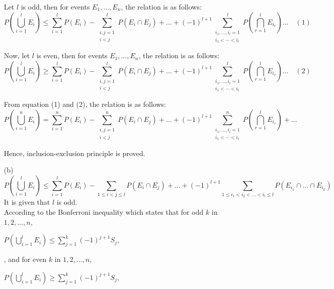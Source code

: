 \documentclass{article}
\begin{document}
\begin{enumerate}
  Let \( l \) is odd, then for events \( E_1, \ldots, E_n \), the relation is as follows:
  \begin{equation*}
  P\left(\bigcup_{i=1}^{l} E_i\right) \leq \sum_{i=1}^{l} P(E_i) - \sum_{\substack{i,j=1 \\ i < j}}^{l} P(E_i \cap E_j) + \ldots + (-1)^{l+1} \sum_{\substack{i_1,\ldots,i_l=1 \\ i_1 < \cdots < i_l}}^{l} P\left(\bigcap_{r=1}^{l} E_{i_r}\right) \ldots \quad (1)
  \end{equation*}
  
  Now, let \( l \) is even, then for events \( E_1, \ldots, E_n \), the relation is as follows:
  \begin{equation*}
  P\left(\bigcup_{i=1}^{l} E_i\right) \geq \sum_{i=1}^{l} P(E_i) - \sum_{\substack{i,j=1 \\ i < j}}^{l} P(E_i \cap E_j) + \ldots + (-1)^{l+1} \sum_{\substack{i_1,\ldots,i_l=1 \\ i_1 < \cdots < i_l}}^{l} P\left(\bigcap_{r=1}^{l} E_{i_r}\right) \ldots \quad (2)
  \end{equation*}
  
  From equation (1) and (2), the relation is as follows:
  \begin{equation*}
  P\left(\bigcup_{i=1}^{n} E_i\right) = \sum_{i=1}^{n} P(E_i) - \sum_{\substack{i,j=1 \\ i < j}}^{n} P(E_i \cap E_j) + \ldots + (-1)^{l+1} \sum_{\substack{i_1,\ldots,i_l=1 \\ i_1 < \cdots < i_l}}^{n} P\left(\bigcap_{r=1}^{l} E_{i_r}\right) + \ldots
  \end{equation*}
  
  Hence, inclusion-exclusion principle is proved. 
  \item[(b)]
  \begin{equation*}
  P\left(\bigcup_{i=1}^{l} E_i\right) \leq \sum_{i=1}^{l} P(E_i) - \sum_{1 \leq i < j \leq l} P(E_i \cap E_j) + \ldots + (-1)^{l+1} \sum_{1 \leq i_1 < i_2 < \dots < i_l \leq l} P\left(E_{i_1}\cap...\cap E_{i_k}\right)
  \end{equation*}
  It is given that \( l \) is odd.\\
  According to the Bonferroni inequality which states that for odd \( k \) in \( 1,2,\ldots,n \),
  \begin{center}
    $P\left(\bigcup_{i=1}^{l} E_i\right) \leq \sum_{j=1}^{k} (-1)^{j+1} S_j,$  
  \end{center}
  , and for even \( k \) in \( 1,2,\ldots,n \),
  \begin{center}
      $P\left(\bigcup_{i=1}^{l} E_i\right) \geq \sum_{j=1}^{k} (-1)^{j+1} S_j$,
  \end{center}


\end{enumerate}
\end{document}
